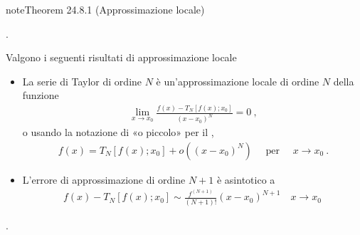 \documentclass[letterpaper,10pt,italian]{jupyterBook}
\begin{document}
\begin{sphinxadmonition}{note}{Theorem 24.8.1 (Approssimazione locale)}



\sphinxAtStartPar
{} .

\sphinxAtStartPar
Valgono i seguenti risultati di approssimazione locale
\begin{itemize}
\item {} 
\sphinxAtStartPar
La serie di Taylor di ordine \(N\) è un’approssimazione locale di ordine \(N\) della funzione
\begin{equation*}
\begin{split}\lim_{x \rightarrow x_0} \frac{f(x) - T_N[f(x); x_0]}{(x-x_0)^N} = 0 \ , \end{split}
\end{equation*}
\sphinxAtStartPar
o usando la notazione di «o piccolo» per il {\hyperref[\detokenize{ch/infinitesimal_calculus/analysis:infinitesimal-calculus-limits-infinite-simal}]{}},
\begin{equation*}
\begin{split}f(x) = T_N[f(x); x_0] + o\left((x-x_0)^N\right) \quad \text{ per } \quad x \rightarrow x_0 \ .\end{split}
\end{equation*}
\item {} 
\sphinxAtStartPar
L’errore di approssimazione di ordine \(N+1\) è asintotico a
\begin{equation*}
\begin{split}f(x) - T_N[f(x); x_0] \sim \frac{f^{(N+1)}}{(N+1)!} (x - x_0)^{N+1} \quad x \rightarrow x_0 \ \end{split}
\end{equation*}
\end{itemize}
\end{sphinxadmonition}

\sphinxAtStartPar
{\hyperref[\detokenize{ch/infinitesimal_calculus/derivatives-notes:infinitesimal-calculus-derivatives-taylor-notes}]{}}.
\end{document}
